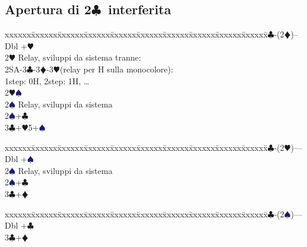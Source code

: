 \documentclass[a4paper,italian]{article}
\newcommand{\BC}{\textcolor{OliveGreen}{$\clubsuit$}}
\newcommand{\BD}{\textcolor{RedOrange}{$\vardiamondsuit$}}
\newcommand{\BH}{\textcolor{Red2}{$\varheartsuit${}}}
\newcommand{\BS}{\textcolor{MidnightBlue}{$\spadesuit${}}}
\newcommand{\pdfc}{\texorpdfstring{\BC{}}{C}}
\newenvironment{bidtable}
{\begin{tabbing}

    xxxxxx\=xxxxxx\=xxxxxx\=xxxxxx\=xxxxxx\=xxxxxx\=xxxxxx\=xxxxxx\=xxxxxx\=xxxxxx\=\kill}
{\end{tabbing} }%
\begin{document}
                                    \begin{multicols}{2}
                                    \subsection{Apertura di 2\pdfc\ interferita}
                                    \begin{bidtable}
                                        2\BC-(2\BD)--\\
                                        Dbl +\BH\+\\
                                            2\BH\> Relay, sviluppi da sistema tranne:
                                            \+\\
                                                2SA-3\BC-3\BD-3\BH (relay per H sulla monocolore):\\
                                                1step: 0H, 2step: 1H, \dots\-\-\\
                                        2\BH{}\BS\+\\
                                            2\BS\> Relay, sviluppi da sistema\-\\
                                        2\BS{}+\BC\\
                                        3\BC{}+\BH5+\BS\\
                                    \end{bidtable}
                                    \begin{bidtable}
                                        2\BC-(2\BH)---\\
                                        Dbl +\BS\+\\
                                            2\BS\> Relay, sviluppi da sistema\-\\
                                        2\BS{}+\BC\\
                                        3\BC{}+\BD\\
                                    \end{bidtable}
                                    \begin{bidtable}
                                        2\BC-(2\BS)---\\
                                        Dbl +\BC\\
                                        3\BC{}+\BD\\

\end{bidtable}
\end{multicols}
\end{document}

